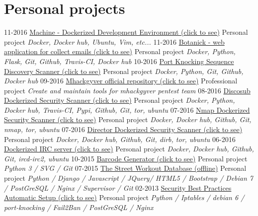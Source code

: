 \documentclass[]{friggeri-cv}
\begin{document}
\section{Personal projects}
\begin{entrylist}
  \entry
    {11-2016}
    {\href{https://github.com/4383/machine}{Machine - Dockerized Development Environment (click to see)}}
    {Personal project}
    {\emph{Docker, Docker hub, Ubuntu, Vim, etc...}}
  \entry
    {11-2016}
    {\href{https://github.com/4383/Botanick}{Botanick - web application for collect emails (click to see)}}
    {Personal project}
    {\emph{Docker, Python, Flask, Git, Github, Travis-CI, Docker hub}}
  \entry
    {10-2016}
    {\href{https://github.com/mhackgyver-squad/porno-king}{Port Knocking Sequence Discovery Scanner (click to see)}}
    {Personal project}
    {\emph{Docker, Python, Git, Github, Docker hub}}
  \entry
    {09-2016}
    {\href{https://github.com/mhackgyver-squad/mhackgyver}{Mhackgyver official repository (click to see)}}
    {Professional project}
    {\emph{Create and maintain tools for mhackgyver pentest team}}
  \entry
    {08-2016}
    {\href{https://hub.docker.com/r/4383/discosub}{Discosub Dockerized Security Scanner (click to see)}}
    {Personal project}
    {\emph{Docker, Python, Docker hub, Travis-CI, Pypi, Github, Git, tor, ubuntu}}
  \entry
    {07-2016}
    {\href{https://hub.docker.com/r/4383/system-service-footprint}{Nmap Dockerized Security Scanner (click to see)}}
    {Personal project}
    {\emph{Docker, Docker hub, Github, Git, nmap, tor, ubuntu}}
  \entry
    {07-2016}
    {\href{https://hub.docker.com/r/4383/director}{Director Dockerized Security Scanner (click to see)}}
    {Personal project}
    {\emph{Docker, Docker hub, Github, Git, dirb, tor, ubuntu}}
  \entry
    {06-2016}
    {\href{https://hub.docker.com/r/4383/irc-server}{Dockerized IRC server (click to see)}}
    {Personal project}
    {\emph{Docker, Docker hub, Github, Git, ircd-irc2, ubuntu}}
  \entry
    {10-2015}
    {\href{http://pypi.python.org/pypi/barcode-generator/0.1rc15}{Barcode Generator (click to see)}}
    {Personal project}
    {\emph{Python 3 / SVG / Git}}
  \entry
    {07-2015}
    {\href{https://github.com/4383/street-workout-database}{The Street Workout Database (offline)}}
    {Personal project}
    {\emph{Python / Django / Javascript / JQuery/ HTML5 / Bootstrap / Debian 7 / PostGreSQL / Nginx / Supervisor / Git}}
  \entry
    {02-2013}
    {\href{https://github.com/4383/fabric-debian/}{Security Best Practices Automatic Setup (click to see)}}
    {Personal project}
    {\emph{Python / Iptables /  debian 6 / port-knocking / Fail2Ban / PostGreSQL / Nginx}}
\end{entrylist}
\end{document}
